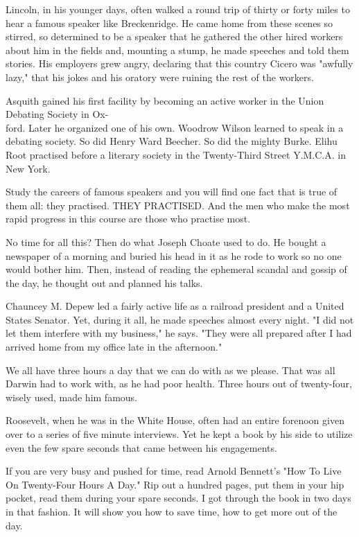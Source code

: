 \documentclass[10pt]{article}
\begin{document}
Lincoln, in his younger days, often walked a round trip of thirty or forty miles to hear a famous speaker like Breckenridge. He came home from these scenes so stirred, so determined to be a speaker that he gathered the other hired workers about him in the fields and, mounting a stump, he made speeches and told them stories. His employers grew angry, declaring that this country Cicero was "awfully lazy," that his jokes and his oratory were ruining the rest of the workers.

Asquith gained his first facility by becoming an active worker in the Union Debating Society in Ox-\\
ford. Later he organized one of his own. Woodrow Wilson learned to speak in a debating society. So did Henry Ward Beecher. So did the mighty Burke. Elihu Root practised before a literary society in the Twenty-Third Street Y.M.C.A. in New York.

Study the careers of famous speakers and you will find one fact that is true of them all: they practised. THEY PRACTISED. And the men who make the most rapid progress in this course are those who practise most.

No time for all this? Then do what Joseph Choate used to do. He bought a newspaper of a morning and buried his head in it as he rode to work so no one would bother him. Then, instead of reading the ephemeral scandal and gossip of the day, he thought out and planned his talks.

Chauncey M. Depew led a fairly active life as a railroad president and a United States Senator. Yet, during it all, he made speeches almost every night. "I did not let them interfere with my business," he says. "They were all prepared after I had arrived home from my office late in the afternoon."

We all have three hours a day that we can do with as we please. That was all Darwin had to work with, as he had poor health. Three hours out of twenty-four, wisely used, made him famous.

Roosevelt, when he was in the White House, often had an entire forenoon given over to a series of five minute interviews. Yet he kept a book by his side to utilize even the few spare seconds that came between his engagements.

If you are very busy and pushed for time, read Arnold Bennett's "How To Live On Twenty-Four Hours A Day." Rip out a hundred pages, put them in your hip pocket, read them during your spare seconds. I got through the book in two days in that fashion. It will show you how to save time, how to get more out of the day.
\end{document}
